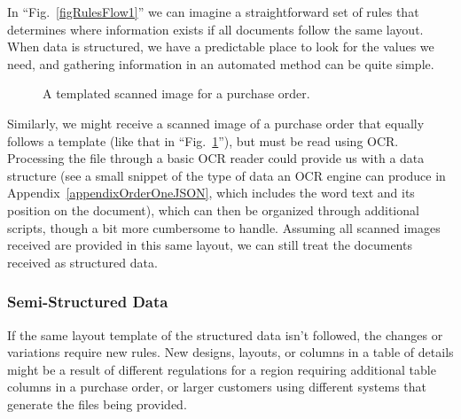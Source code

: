 \documentclass[conference]{IEEEtran}
\begin{document}
In ``Fig.~\ref{figRulesFlow1}'' we can imagine a straightforward set of rules that determines where information exists if all documents follow the same layout. When data is structured, we have a predictable place to look for the values we need, and gathering information in an automated method can be quite simple.

\begin{figure}[ht]
\centerline{
}
\caption{A templated scanned image for a purchase order.}
\label{figScanned1}
\end{figure}

Similarly, we might receive a scanned image of a purchase order that equally follows a template (like that in ``Fig.~\ref{figScanned1}''), but must be read using OCR. Processing the file through a basic OCR reader could provide us with a data structure (see a small snippet of the type of data an OCR engine can produce in Appendix~\ref{appendixOrderOneJSON}, which includes the word text and its position on the document), which can then be organized through additional scripts, though a bit more cumbersome to handle. Assuming all scanned images received are provided in this same layout, we can still treat the documents received as structured data.

\subsubsection{Semi-Structured Data}
If the same layout template of the structured data isn't followed, the changes or variations require new rules. New designs, layouts, or columns in a table of details might be a result of different regulations for a region requiring additional table columns in a purchase order, or larger customers using different systems that generate the files being provided.
\end{document}
